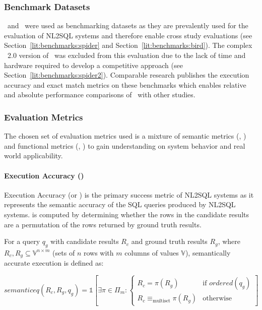 \subsubsection{Benchmark Datasets}

\Spider~and \Bird~were used as benchmarking datasets as they are prevalently
used for the evaluation of NL2SQL systems and therefore enable cross study
evaluations (see Section~\ref{lit:benchmarks:spider} and
Section~\ref{lit:benchmarks:bird}). The complex \Spider~2.0 version of \Spider~was
excluded from this evaluation due to the lack of time and hardware required to
develop a competitive approach (see Section~\ref{lit:benchmarks:spider2}).
Comparable research publishes the execution accuracy and exact match metrics on
these benchmarks which enables relative and absolute performance comparisons of
\Natural~with other studies.

\subsubsection{Evaluation Metrics}\label{eval:metrics}

The chosen set of evaluation metrics used is a mixture of semantic metrics
(\EA, \EM) and functional metrics (\ER, \CL) to gain understanding on system
behavior and real world applicability.

\paragraph{Execution Accuracy (\EA)}

Execution Accuracy (or \EA) is the primary success metric of NL2SQL systems as
it represents the semantic accuracy of the SQL queries produced by NL2SQL
systems. \EA is computed by determining whether the rows in the candidate
results are a permutation of the rows returned by ground truth results. 

For a query $q_g$ with candidate results $R_c$ and ground truth results $R_g$, 
where $R_c, R_g \subseteq \mathbb{V}^{n \times m}$ (sets of $n$ rows with $m$
columns of values $\mathbb{V}$), semantically accurate execution is defined as:

\begin{equation}
    semanticeq(R_c, R_g, q_g) = \mathbb{1}\left[\exists \pi \in \Pi_m : 
    \begin{cases}
        R_c = \pi(R_g) & \text{if } ordered(q_g) \\
        R_c \equiv_{\text{multiset}} \pi(R_g) & \text{otherwise}
    \end{cases}
    \right]
\end{equation}


